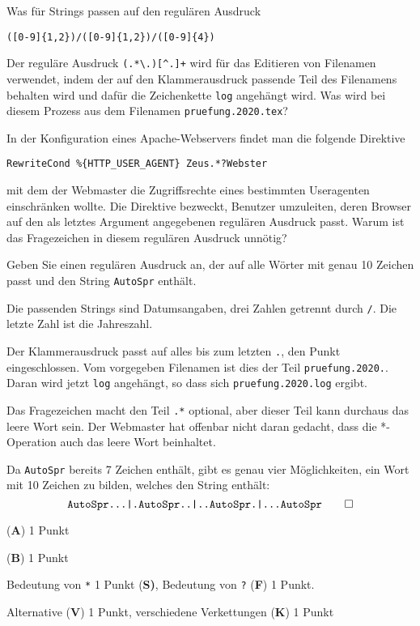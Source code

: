 \begin{teilaufgaben}
\item Was für Strings passen auf den regulären Ausdruck
\begin{verbatim}
([0-9]{1,2})/([0-9]{1,2})/([0-9]{4})
\end{verbatim}
\item
Der reguläre Ausdruck \texttt{(.*\textbackslash.)[\textasciicircum.]+} wird
für das Editieren von Filenamen verwendet, indem der auf den Klammerausdruck
passende Teil des Filenamens behalten wird und dafür die Zeichenkette
\texttt{log} angehängt wird.
Was wird bei diesem Prozess aus dem Filenamen \texttt{pruefung.2020.tex}?
\item
In der Konfiguration eines Apache-Webservers findet man die
folgende Direktive
\begin{verbatim}
RewriteCond %{HTTP_USER_AGENT} Zeus.*?Webster
\end{verbatim}
mit dem der Webmaster die Zugriffsrechte eines bestimmten Useragenten
einschränken wollte.
Die Direktive bezweckt, Benutzer umzuleiten, deren Browser auf den als
letztes Argument angegebenen regulären Ausdruck passt.
Warum ist das Fragezeichen in diesem regulären Ausdruck unnötig?
\item
Geben Sie einen regulären Ausdruck an, der auf alle Wörter mit genau
10 Zeichen passt und den String \texttt{AutoSpr} enthält.
\end{teilaufgaben}


\begin{loesung}
\begin{teilaufgaben}
\item Die passenden Strings sind Datumsangaben, drei Zahlen getrennt durch
\texttt{/}.
Die letzte Zahl ist die Jahreszahl.
\item Der Klammerausdruck passt auf alles bis zum letzten \texttt{.},
den Punkt eingeschlossen.
Vom vorgegeben Filenamen ist dies der Teil \texttt{pruefung.2020.}.
Daran wird jetzt \texttt{log} angehängt, so dass sich
\texttt{pruefung.2020.log} ergibt.
\item Das Fragezeichen macht den Teil \texttt{.*} optional, aber dieser
Teil kann durchaus das leere Wort sein.
Der Webmaster hat offenbar nicht daran gedacht, dass die *-Operation
auch das leere Wort beinhaltet.
\item Da \texttt{AutoSpr} bereits 7 Zeichen enthält, gibt es genau vier
Möglichkeiten, ein Wort mit 10 Zeichen zu bilden, welches den String
enthält:
\[
\texttt{AutoSpr...|.AutoSpr..|..AutoSpr.|...AutoSpr}
\qedhere
\]
\end{teilaufgaben}
\end{loesung}

\begin{bewertung}
\begin{teilaufgaben}
\item ({\bf A}) 1 Punkt
\item ({\bf B}) 1 Punkt
\item Bedeutung von \texttt{*} 1 Punkt {(\bf S)},
Bedeutung von \texttt{?} ({\bf F}) 1 Punkt.
\item Alternative ({\bf V}) 1 Punkt, verschiedene Verkettungen ({\bf K}) 1 Punkt
\end{teilaufgaben}
\end{bewertung}


